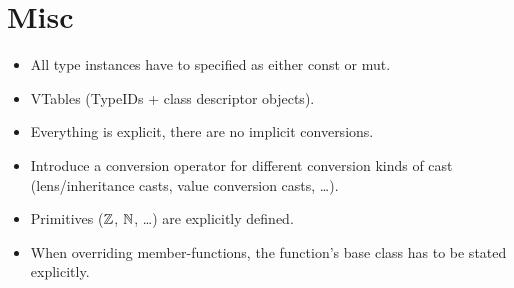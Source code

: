 \section{Misc}
\begin{itemize}
	\item All type instances have to specified as either const or mut.
	\item VTables (TypeIDs + class descriptor objects).
	\item Everything is explicit, there are no implicit conversions.
	\item Introduce a conversion operator for different conversion kinds of cast (lens/inheritance casts, value conversion casts, \dots).
	\item Primitives ($\mathbb{Z}$, $\mathbb{N}$, \dots) are explicitly defined.
	\item When overriding member-functions, the function's base class has to be stated explicitly.
\end{itemize}
